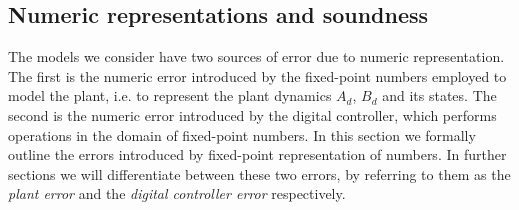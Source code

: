 \documentclass[runningheads,a4paper]{llncs}
\begin{document}
\subsection{Numeric representations and soundness} 
\label{sec:numeric_rep}







The 
models we consider have two sources of error due to numeric representation. 
The first is the numeric error introduced by the fixed-point numbers employed to model the plant, i.e. to represent the plant dynamics $A_d$, $B_d$ and its states. 
The second is the numeric error introduced by the digital controller, 
which 
performs operations in the domain of fixed-point numbers. 
In this section we formally outline the errors introduced by fixed-point representation of numbers. 
In further sections we will differentiate between these two errors, 
by referring to them as the \emph{plant error} and the \emph{digital controller error} respectively. 
\end{document}
